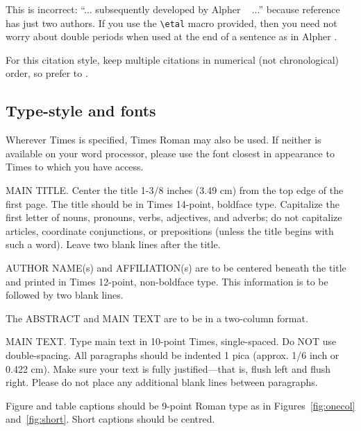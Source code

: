 \documentclass[10pt,twocolumn,letterpaper]{article}
\begin{document}
This is incorrect: ``... subsequently developed by Alpher \etal~\cite{Alpher03}
...'' because reference~\cite{Alpher03} has just two authors.  If you use the
\verb'\etal' macro provided, then you need not worry about double periods when
used at the end of a sentence as in Alpher \etal.

For this citation style, keep multiple citations in numerical (not
chronological) order, so prefer \cite{Alpher03,Alpher02,Authors14} to
\cite{Alpher02,Alpher03,Authors14}.


\begin{figure*}
\begin{center}
\fbox{\rule{0pt}{2in} \rule{.9\linewidth}{0pt}}
\end{center}
   \caption{Example of a short caption, which should be centered.}
\label{fig:short}
\end{figure*}

\subsection{Type-style and fonts}

Wherever Times is specified, Times Roman may also be used. If neither is
available on your word processor, please use the font closest in appearance to
Times to which you have access.

MAIN TITLE. Center the title 1-3/8 inches (3.49 cm) from the top edge of the
first page. The title should be in Times 14-point, boldface type. Capitalize the
first letter of nouns, pronouns, verbs, adjectives, and adverbs; do not
capitalize articles, coordinate conjunctions, or prepositions (unless the title
begins with such a word). Leave two blank lines after the title.

AUTHOR NAME(s) and AFFILIATION(s) are to be centered beneath the title and
printed in Times 12-point, non-boldface type. This information is to be followed
by two blank lines.

The ABSTRACT and MAIN TEXT are to be in a two-column format.

MAIN TEXT. Type main text in 10-point Times, single-spaced. Do NOT use
double-spacing. All paragraphs should be indented 1 pica (approx. 1/6 inch or
0.422 cm). Make sure your text is fully justified---that is, flush left and
flush right. Please do not place any additional blank lines between paragraphs.

Figure and table captions should be 9-point Roman type as in
Figures~\ref{fig:onecol} and~\ref{fig:short}.  Short captions should be centred.
\end{document}

